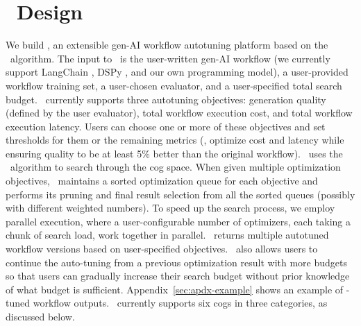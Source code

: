 \section{\sysname\ Design}
\label{sec:cognify}

We build \sysname, an extensible gen-AI workflow autotuning platform based on the \search\ algorithm. The input to \sysname\ is the user-written gen-AI workflow (we currently support LangChain \cite{langchain-repo}, DSPy \cite{khattab2024dspy}, and our own programming model), a user-provided workflow training set, a user-chosen evaluator, and a user-specified total search budget. \sysname\ currently supports three autotuning objectives: generation quality (defined by the user evaluator), total workflow execution cost, and total workflow execution latency. Users can choose one or more of these objectives and set thresholds for them or the remaining metrics (\eg, optimize cost and latency while ensuring quality to be at least 5\% better than the original workflow). 
\sysname\ uses the \search\ algorithm to search through the cog space.
When given multiple optimization objectives, \sysname\ maintains a sorted optimization queue for each objective and performs its pruning and final result selection from all the sorted queues (possibly with different weighted numbers).
To speed up the search process, we employ parallel execution, where a user-configurable number of optimizers, each taking a chunk of search load, work together in parallel. %
\sysname\ returns multiple autotuned workflow versions based on user-specified objectives.
\sysname\ also allows users to continue the auto-tuning from a previous optimization result with more budgets so that users can gradually increase their search budget without prior knowledge of what budget is sufficient.
Appendix~\ref{sec:apdx-example} shows an example of \sysname-tuned workflow outputs. 
\sysname\ currently supports six cogs in three categories, as discussed below. 



